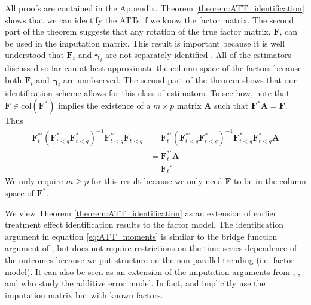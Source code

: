 \documentclass[12pt]{article}
\newcommand{\nick}[1]{\coauthorComment[Nick]{#1}}
\newcommand{\kyle}[1]{\coauthorComment[Kyle]{#1}}
\begin{document}
All proofs are contained in the Appendix. Theorem \ref{theorem:ATT_identification} shows that we can identify the ATTs if we know the factor matrix. The second part of the theorem suggests that any rotation of the true factor matrix, $\bm{F}$, can be used in the imputation matrix. This result is important because it is well understood that $\bm{F}_t$ and $\bm{\gamma}_i$ are not separately identified \citep{Bai_2009,Ahn_Lee_Schmidt_2013,xu2017generalized}. All of the estimators discussed so far can at best approximate the column space of the factors because both $\bm{F}_t$ and $\bm \gamma_i$ are unobserved. The second part of the theorem shows that our identification scheme allows for this class of estimators. To see how, note that $\bm F \in \text{col}(\bm F^*)$ implies the existence of a $m \times p$ matrix $\bm A$ such that $\bm F^* \bm A = \bm F$. Thus 
\begin{align*}
    \bm F_t^{*'} \left(\bm F_{t < g}^{*'} \bm F_{t < g}^{*} \right)^{-1} \bm F_{t < g}^{*'} \bm F_{t < g} 
    &= \bm F_t^{*'} \left(\bm F_{t < g}^{*'} \bm F_{t < g}^{*} \right)^{-1} \bm F_{t < g}^{*'} \bm F_{t < g}^* \bm A\\
    &= \bm F_t^{*'} \bm A\\
    &= \bm F_t'
\end{align*}
We only require $m \geq p$ for this result because we only need $\bm F$ to be in the column space of $\bm F^*$. 

We view Theorem \ref{theorem:ATT_identification} as an extension of earlier treatment effect identification results to the factor model. The identification argument in equation \eqref{eq:ATT_moments} is similar to the bridge function argument of \citet{Imbens_Kallus_Mao_2021}, but does not require restrictions on the time series dependence of the outcomes because we put structure on the non-parallel trending (i.e. factor model). It can also be seen as an extension of the imputation arguments from \citet{Gardner_2021}, \citet{Wooldridge_2021}, and \citet{Borusyak_Jaravel_Spiess_2021} who study the additive error model. In fact, \citet{Gardner_2021} and \citet{Borusyak_Jaravel_Spiess_2021} implicitly use the imputation matrix but with known factors. 

\end{document}
